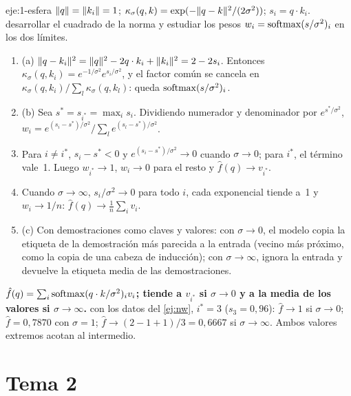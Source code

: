\begin{solucion}{eje:1-esfera}
\datos $\lVert q\rVert=\lVert k_i\rVert=1$; $\kappa_\sigma(q,k)=\exp(-\lVert q-k\rVert^{2}/(2\sigma^{2}))$; $s_i=q\cdot k_i$.
\planteamiento desarrollar el cuadrado de la norma y estudiar los pesos $w_i=\operatorname{softmax}(s/\sigma^{2})_i$ en los dos límites.
\pasos
\begin{enumerate}[label=\arabic*.]
  \item (a) $\lVert q-k_i\rVert^{2}=\lVert q\rVert^{2}-2q\cdot k_i+\lVert k_i\rVert^{2}=2-2s_i$. Entonces $\kappa_\sigma(q,k_i)=e^{-1/\sigma^{2}}e^{s_i/\sigma^{2}}$, y el factor común se cancela en $\kappa_\sigma(q,k_i)/\sum_l\kappa_\sigma(q,k_l)$: queda $\operatorname{softmax}(s/\sigma^{2})_i$.
  \item (b) Sea $s^\ast=s_{i^\ast}=\max_i s_i$. Dividiendo numerador y denominador por $e^{s^\ast/\sigma^{2}}$, $w_i=e^{(s_i-s^\ast)/\sigma^{2}}/\sum_l e^{(s_l-s^\ast)/\sigma^{2}}$.
  \item Para $i\ne i^\ast$, $s_i-s^\ast<0$ y $e^{(s_i-s^\ast)/\sigma^{2}}\to 0$ cuando $\sigma\to 0$; para $i^\ast$, el término vale~1. Luego $w_{i^\ast}\to 1$, $w_i\to 0$ para el resto y $\hat f(q)\to v_{i^\ast}$.
  \item Cuando $\sigma\to\infty$, $s_i/\sigma^{2}\to 0$ para todo $i$, cada exponencial tiende a~1 y $w_i\to 1/n$: $\hat f(q)\to\frac1n\sum_i v_i$.
  \item (c) Con demostraciones como claves y valores: con $\sigma\to 0$, el modelo copia la etiqueta de la demostración más parecida a la entrada (vecino más próximo, como la copia de una cabeza de inducción); con $\sigma\to\infty$, ignora la entrada y devuelve la etiqueta media de las demostraciones.
\end{enumerate}
\resultado \textbf{$\hat f(q)=\sum_i\operatorname{softmax}(q\cdot k/\sigma^{2})_iv_i$; tiende a $v_{i^\ast}$ si $\sigma\to 0$ y a la media de los valores si $\sigma\to\infty$.}
\comprobacion con los datos del \cref{ej:nw}, $i^\ast=3$ ($s_3=0{,}96$): $\hat f\to 1$ si $\sigma\to 0$; $\hat f=0{,}7870$ con $\sigma=1$; $\hat f\to(2-1+1)/3=0{,}6667$ si $\sigma\to\infty$. Ambos valores extremos acotan al intermedio.
\end{solucion}

\section{Tema 2}

